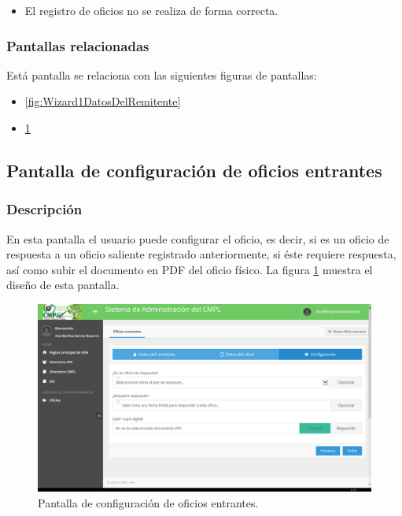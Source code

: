 	\begin{itemize}
		\item El registro de oficios no se realiza de forma correcta.
	\end{itemize}

\subsubsection{Pantallas relacionadas}
Está pantalla se relaciona con las siguientes figuras de pantallas:
	\begin{itemize}
		\item \ref{fig:Wizard1DatosDelRemitente}
		\item \ref{fig:Wizard3Configuracion}
	\end{itemize}

\subsection{Pantalla de configuración de oficios entrantes}
\subsubsection{Descripción}
	En esta pantalla el usuario puede configurar el oficio, es decir, si es un oficio de respuesta a un oficio saliente registrado anteriormente, si éste requiere respuesta, así como subir el documento en PDF del oficio físico. La figura \ref{fig:Wizard3Configuracion} muestra el diseño de esta pantalla.		
		
	\begin{figure}[htbp!]
		\centering
			\includegraphics[width=1\textwidth]{Pantallas/Wizard3Configuracion.png}
		\caption{Pantalla de configuración de oficios entrantes.}
		\label{fig:Wizard3Configuracion}
	\end{figure}

